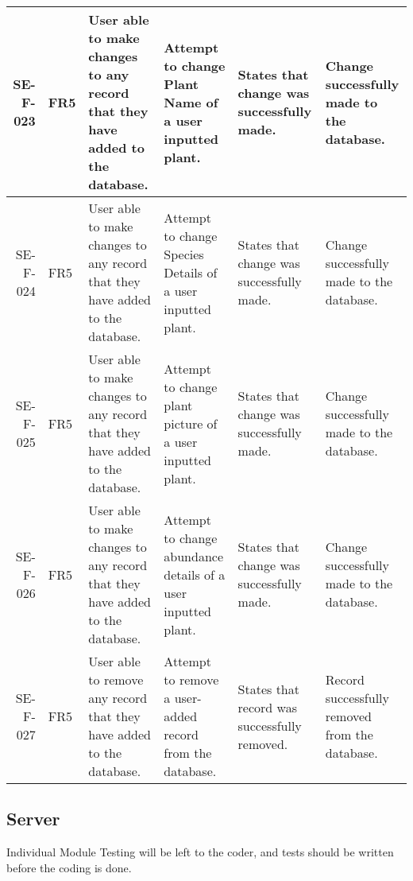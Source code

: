 \begin{landscape}
\begin{longtable}{|r|l|p{4cm}|p{4cm}|p{4cm}|p{4cm}|}
		SE-F-023 & FR5 & User able to make changes to any record that they have added to the database. & Attempt to change Plant Name of a user inputted plant. & States that change was successfully made. & Change successfully made to the database. \\ \hline
		SE-F-024 & FR5 & User able to make changes to any record that they have added to the database. & Attempt to change Species Details of a user inputted plant. & States that change was successfully made. & Change successfully made to the database. \\ \hline
		SE-F-025 & FR5 & User able to make changes to any record that they have added to the database. & Attempt to change plant picture of a user inputted plant. & States that change was successfully made. & Change successfully made to the database. \\ \hline
		SE-F-026 & FR5 & User able to make changes to any record that they have added to the database. & Attempt to change abundance details of a user inputted plant. & States that change was successfully made. & Change successfully made to the database. \\ \hline
		SE-F-027 & FR5 & User able to remove any record that they have added to the database. & Attempt to remove a user-added record from the database. & States that record was successfully removed. & Record successfully removed from the database. \\ \hline
		\end{longtable}
	\end{landscape}

\subsection{Server}
	Individual Module Testing will be left to the coder, and tests should be written before the coding is done.

